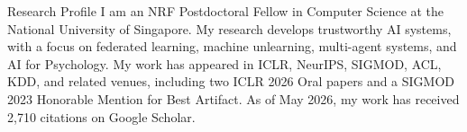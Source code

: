 \begin{rSection}{Research Profile}
    I am an NRF Postdoctoral Fellow in Computer Science at the National University of Singapore. My research develops trustworthy AI systems, with a focus on federated learning, machine unlearning, multi-agent systems, and AI for Psychology. My work has appeared in ICLR, NeurIPS, SIGMOD, ACL, KDD, and related venues, including two ICLR 2026 Oral papers and a SIGMOD 2023 Honorable Mention for Best Artifact. As of May 2026, my work has received 2,710 citations on Google Scholar.
\end{rSection}
